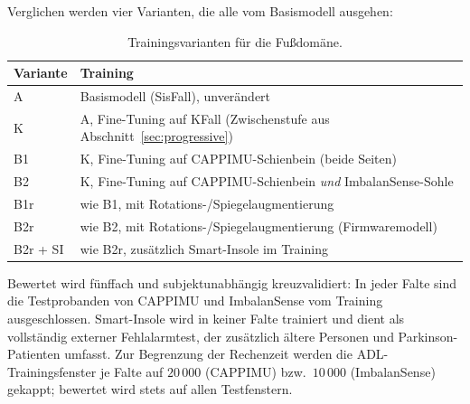\documentclass[11pt,a4paper,oneside]{report}
\begin{document}
Verglichen werden vier Varianten, die alle vom Basismodell ausgehen:

\begin{table}[H]
\centering
\caption{Trainingsvarianten für die Fußdomäne.}
\label{tab:fuss_varianten}
\small
\begin{tabularx}{0.95\textwidth}{l X}
\toprule
\textbf{Variante} & \textbf{Training} \\
\midrule
A  & Basismodell (SisFall), unverändert \\
K  & A, Fine-Tuning auf KFall (Zwischenstufe aus Abschnitt~\ref{sec:progressive}) \\
B1 & K, Fine-Tuning auf CAPPIMU-Schienbein (beide Seiten) \\
B2 & K, Fine-Tuning auf CAPPIMU-Schienbein \emph{und} ImbalanSense-Sohle \\
\midrule
B1r & wie B1, mit Rotations-/Spiegelaugmentierung \\
B2r & wie B2, mit Rotations-/Spiegelaugmentierung (Firmwaremodell) \\
B2r + SI & wie B2r, zusätzlich Smart-Insole im Training \\
\bottomrule
\end{tabularx}
\end{table}

Bewertet wird fünffach und subjektunabhängig kreuzvalidiert: In jeder
Falte sind die Testprobanden von CAPPIMU und ImbalanSense vom Training
ausgeschlossen. Smart-Insole wird in keiner Falte trainiert und dient
als vollständig externer Fehlalarmtest, der zusätzlich ältere Personen
und Parkinson-Patienten umfasst. Zur Begrenzung der Rechenzeit werden
die ADL-Trainingsfenster je Falte auf $20\,000$ (CAPPIMU) bzw.\
$10\,000$ (ImbalanSense) gekappt; bewertet wird stets auf allen
Testfenstern.
\end{document}
